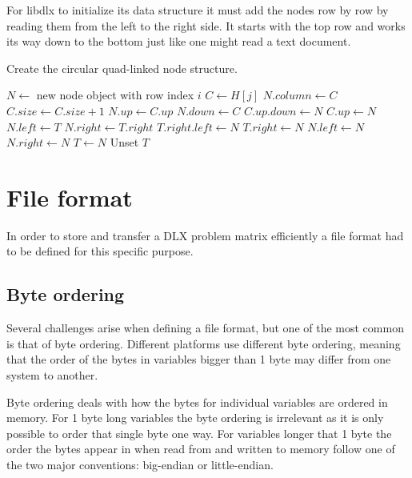 For libdlx to initialize its data structure it must add the nodes row by row by reading them from the left to the right side.
It starts with the top row and works its way down to the bottom just like one might read a text document.

\begin{algorithm}[H]
	\caption{Create the circular quad-linked node structure.}
	\label{alg:nodes}
	\begin{distribalgo}[1]
				\STATE $N \leftarrow$ new node object with row index $i$
				\STATE $C \leftarrow H[j]$
				\STATE $N.column \leftarrow C$
				\STATE $C.size \leftarrow C.size + 1$
				\STATE $N.up \leftarrow C.up$
				\STATE $N.down \leftarrow C$
				\STATE $C.up.down \leftarrow N$
				\STATE $C.up \leftarrow N$
					\STATE $N.left \leftarrow T$
					\STATE $N.right \leftarrow T.right$
					\STATE $T.right.left \leftarrow N$
					\STATE $T.right \leftarrow N$
				\ELSE
					\STATE $N.left \leftarrow N$  
					\STATE $N.right \leftarrow N$
				\ENDIF
				\STATE $T \leftarrow N$
			\ENDFOR
			\STATE Unset $T$
		\ENDFOR
	\end{distribalgo}
\end{algorithm}



\section{File format}

In order to store and transfer a DLX problem matrix efficiently a file format had to be defined for this specific purpose.


\subsection{Byte ordering}

Several challenges arise when defining a file format, but one of the most common is that of byte ordering.
Different platforms use different byte ordering, meaning that the order of the bytes in variables bigger than 1 byte may differ from one system to another.

Byte ordering deals with how the bytes for individual variables are ordered in memory.
For 1 byte long variables the byte ordering is irrelevant as it is only possible to order that single byte one way.
For variables longer that 1 byte the order the bytes appear in when read from and written to memory follow one of the two major conventions: big-endian or little-endian.

